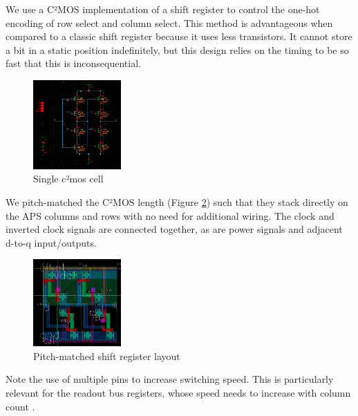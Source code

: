 \documentclass[lettersize,journal]{IEEEtran}
\begin{document}
We use a C²MOS implementation of a shift register to control the one-hot encoding of row select and column select.
This method is advantageous when compared to a classic shift register because it uses less transistors. It cannot store a bit in a static position indefinitely, but this design relies on the timing to be so fast that this is inconsequential.\\
\begin{figure}[h]
	\centering
	\includegraphics[width =0.3\textwidth]{c2mosschem}
	\caption{Single c²mos cell}
	\label{c2mosschem}
\end{figure}

We pitch-matched the C²MOS length (Figure \ref{shiftreglayout}) such that they stack directly on the APS columns and rows with no need for additional wiring. The clock and inverted clock signals are connected together, as are power signals and adjacent d-to-q input/outputs.
\begin{figure}[h]
	\centering
	\includegraphics[width =0.3\textwidth]{shiftreglayout.png}
	\caption{Pitch-matched shift register layout}
	\label{shiftreglayout}
\end{figure}

Note the use of multiple pins to increase switching speed. This is particularly relevant for the readout bus registers, whose speed needs to increase with column count \cite{photodiodes}.
\end{document}
